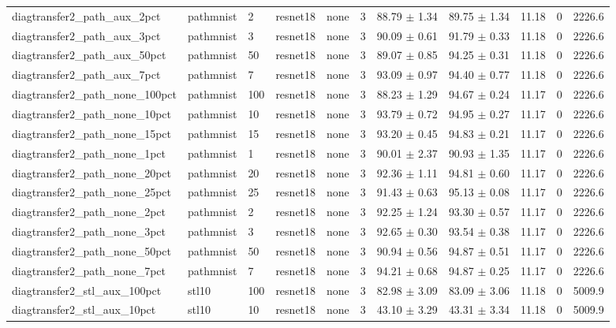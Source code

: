 \begin{tabular}{lllllllllll}
diagtransfer2_path_aux_2pct & pathmnist & 2 & resnet18 & none & 3 & 88.79 $\pm$ 1.34 & 89.75 $\pm$ 1.34 & 11.18 & 0 & 2226.6 \\
diagtransfer2_path_aux_3pct & pathmnist & 3 & resnet18 & none & 3 & 90.09 $\pm$ 0.61 & 91.79 $\pm$ 0.33 & 11.18 & 0 & 2226.6 \\
diagtransfer2_path_aux_50pct & pathmnist & 50 & resnet18 & none & 3 & 89.07 $\pm$ 0.85 & 94.25 $\pm$ 0.31 & 11.18 & 0 & 2226.6 \\
diagtransfer2_path_aux_7pct & pathmnist & 7 & resnet18 & none & 3 & 93.09 $\pm$ 0.97 & 94.40 $\pm$ 0.77 & 11.18 & 0 & 2226.6 \\
diagtransfer2_path_none_100pct & pathmnist & 100 & resnet18 & none & 3 & 88.23 $\pm$ 1.29 & 94.67 $\pm$ 0.24 & 11.17 & 0 & 2226.6 \\
diagtransfer2_path_none_10pct & pathmnist & 10 & resnet18 & none & 3 & 93.79 $\pm$ 0.72 & 94.95 $\pm$ 0.27 & 11.17 & 0 & 2226.6 \\
diagtransfer2_path_none_15pct & pathmnist & 15 & resnet18 & none & 3 & 93.20 $\pm$ 0.45 & 94.83 $\pm$ 0.21 & 11.17 & 0 & 2226.6 \\
diagtransfer2_path_none_1pct & pathmnist & 1 & resnet18 & none & 3 & 90.01 $\pm$ 2.37 & 90.93 $\pm$ 1.35 & 11.17 & 0 & 2226.6 \\
diagtransfer2_path_none_20pct & pathmnist & 20 & resnet18 & none & 3 & 92.36 $\pm$ 1.11 & 94.81 $\pm$ 0.60 & 11.17 & 0 & 2226.6 \\
diagtransfer2_path_none_25pct & pathmnist & 25 & resnet18 & none & 3 & 91.43 $\pm$ 0.63 & 95.13 $\pm$ 0.08 & 11.17 & 0 & 2226.6 \\
diagtransfer2_path_none_2pct & pathmnist & 2 & resnet18 & none & 3 & 92.25 $\pm$ 1.24 & 93.30 $\pm$ 0.57 & 11.17 & 0 & 2226.6 \\
diagtransfer2_path_none_3pct & pathmnist & 3 & resnet18 & none & 3 & 92.65 $\pm$ 0.30 & 93.54 $\pm$ 0.38 & 11.17 & 0 & 2226.6 \\
diagtransfer2_path_none_50pct & pathmnist & 50 & resnet18 & none & 3 & 90.94 $\pm$ 0.56 & 94.87 $\pm$ 0.51 & 11.17 & 0 & 2226.6 \\
diagtransfer2_path_none_7pct & pathmnist & 7 & resnet18 & none & 3 & 94.21 $\pm$ 0.68 & 94.87 $\pm$ 0.25 & 11.17 & 0 & 2226.6 \\
diagtransfer2_stl_aux_100pct & stl10 & 100 & resnet18 & none & 3 & 82.98 $\pm$ 3.09 & 83.09 $\pm$ 3.06 & 11.18 & 0 & 5009.9 \\
diagtransfer2_stl_aux_10pct & stl10 & 10 & resnet18 & none & 3 & 43.10 $\pm$ 3.29 & 43.31 $\pm$ 3.34 & 11.18 & 0 & 5009.9 \\

\end{tabular}
